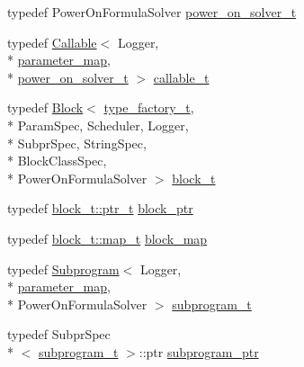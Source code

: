 \begin{DoxyCompactItemize}
\item 
typedef Power\-On\-Formula\-Solver \hyperlink{structLIBKMS__namespace_1_1class__spec_ae650b07a7b46bdfde5f0bb07761523de}{power\-\_\-on\-\_\-solver\-\_\-t}
\item 
typedef \hyperlink{classLIBKMS__namespace_1_1Callable}{Callable}$<$ Logger, \\*
\hyperlink{structLIBKMS__namespace_1_1class__spec_a084ce0bd5bd9ead6059b0e35d04a4785}{parameter\-\_\-map}, \\*
\hyperlink{structLIBKMS__namespace_1_1class__spec_ae650b07a7b46bdfde5f0bb07761523de}{power\-\_\-on\-\_\-solver\-\_\-t} $>$ \hyperlink{structLIBKMS__namespace_1_1class__spec_a1825fec3cf7f751c18fa6c89e9068d42}{callable\-\_\-t}
\item 
typedef \hyperlink{classLIBKMS__namespace_1_1Block}{Block}$<$ \hyperlink{structLIBKMS__namespace_1_1class__spec_a2abf5149a27867873b0c0463c3bb376b}{type\-\_\-factory\-\_\-t}, \\*
Param\-Spec, Scheduler, Logger, \\*
Subpr\-Spec, String\-Spec, \\*
Block\-Class\-Spec, \\*
Power\-On\-Formula\-Solver $>$ \hyperlink{structLIBKMS__namespace_1_1class__spec_a92d07492e14366ebea16a661abd33180}{block\-\_\-t}
\item 
typedef \hyperlink{classLIBKMS__namespace_1_1Block_a85039a495a9c40a4425de6a5291decbe}{block\-\_\-t\-::ptr\-\_\-t} \hyperlink{structLIBKMS__namespace_1_1class__spec_acbfd7c07aa4238536acc8d1ee3bca661}{block\-\_\-ptr}
\item 
typedef \hyperlink{classLIBKMS__namespace_1_1Block_aedba90f9127d999f41d7d397e691e081}{block\-\_\-t\-::map\-\_\-t} \hyperlink{structLIBKMS__namespace_1_1class__spec_a2f616ebd1545da2b36511f8d88ed113c}{block\-\_\-map}
\item 
typedef \hyperlink{classLIBKMS__namespace_1_1Subprogram}{Subprogram}$<$ Logger, \\*
\hyperlink{structLIBKMS__namespace_1_1class__spec_a084ce0bd5bd9ead6059b0e35d04a4785}{parameter\-\_\-map}, \\*
Power\-On\-Formula\-Solver $>$ \hyperlink{structLIBKMS__namespace_1_1class__spec_a145748a703c1c753bce703ced41fc506}{subprogram\-\_\-t}
\item 
typedef Subpr\-Spec\\*
$<$ \hyperlink{structLIBKMS__namespace_1_1class__spec_a145748a703c1c753bce703ced41fc506}{subprogram\-\_\-t} $>$\-::ptr \hyperlink{structLIBKMS__namespace_1_1class__spec_a4b3f90a3ca3d3b067ea8514815908320}{subprogram\-\_\-ptr}

\end{DoxyCompactItemize}
